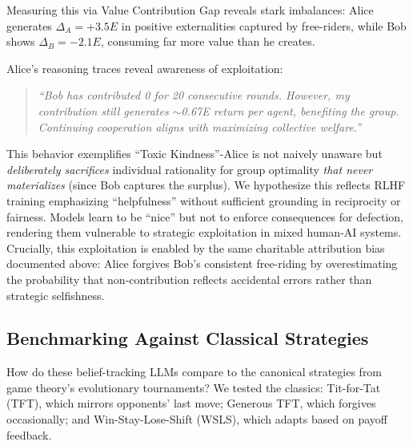 \documentclass{uai2026} %
\begin{document}
Measuring this via Value Contribution Gap reveals stark imbalances: Alice generates $\Delta_A = +3.5E$ in positive externalities captured by free-riders, while Bob shows $\Delta_B = -2.1E$, consuming far more value than he creates.

Alice's reasoning traces reveal awareness of exploitation:
\begin{quote}
\textit{``Bob has contributed 0 for 20 consecutive rounds. However, my contribution still generates $\sim$0.67E return per agent, benefiting the group. Continuing cooperation aligns with maximizing collective welfare.''}
\end{quote}

This behavior exemplifies ``Toxic Kindness''-Alice is not naively unaware but \textit{deliberately sacrifices} individual rationality for group optimality \textit{that never materializes} (since Bob captures the surplus). We hypothesize this reflects RLHF training \citep{ouyang2022training,bai2022constitutional} emphasizing ``helpfulness'' without sufficient grounding in reciprocity or fairness. Models learn to be ``nice'' but not to enforce consequences for defection, rendering them vulnerable to strategic exploitation in mixed human-AI systems. Crucially, this exploitation is enabled by the same charitable attribution bias documented above: Alice forgives Bob's consistent free-riding by overestimating the probability that non-contribution reflects accidental errors rather than strategic selfishness.

\subsection{Benchmarking Against Classical Strategies}

How do these belief-tracking LLMs compare to the canonical strategies from game theory's evolutionary tournaments? We tested the classics: Tit-for-Tat (TFT), which mirrors opponents' last move; Generous TFT, which forgives occasionally; and Win-Stay-Lose-Shift (WSLS), which adapts based on payoff feedback.
\end{document}
